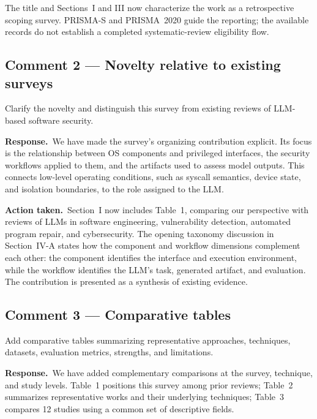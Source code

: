 \documentclass[11pt,a4paper]{article}
\newcommand{\response}{\par\textbf{Response.}\ }
\newcommand{\action}{\par\textbf{Action taken.}\ }
\begin{document}
The title and Sections~I and III now characterize the work as a retrospective scoping survey. PRISMA-S and PRISMA~2020 guide the reporting; the available records do not establish a completed systematic-review eligibility flow.

\subsection{Comment 2 --- Novelty relative to existing surveys}
\begin{reviewcomment}
Clarify the novelty and distinguish this survey from existing reviews of LLM-based software security.
\end{reviewcomment}

\response We have made the survey's organizing contribution explicit. Its focus is the relationship between OS components and privileged interfaces, the security workflows applied to them, and the artifacts used to assess model outputs. This connects low-level operating conditions, such as syscall semantics, device state, and isolation boundaries, to the role assigned to the LLM.

\action Section~I now includes Table~1, comparing our perspective with reviews of LLMs in software engineering, vulnerability detection, automated program repair, and cybersecurity. The opening taxonomy discussion in Section~IV-A states how the component and workflow dimensions complement each other: the component identifies the interface and execution environment, while the workflow identifies the LLM's task, generated artifact, and evaluation. The contribution is presented as a synthesis of existing evidence.

\subsection{Comment 3 --- Comparative tables}
\begin{reviewcomment}
Add comparative tables summarizing representative approaches, techniques, datasets, evaluation metrics, strengths, and limitations.
\end{reviewcomment}

\response We have added complementary comparisons at the survey, technique, and study levels. Table~1 positions this survey among prior reviews; Table~2 summarizes representative works and their underlying techniques; Table~3 compares 12 studies using a common set of descriptive fields.
\end{document}
